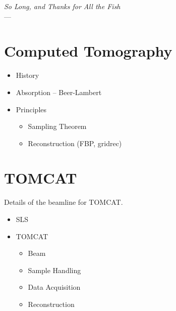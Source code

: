\label{ch:ct}
\begin{flushright}{\slshape    
		So Long, and Thanks for All the Fish} \\ \medskip
    ---  \citep{Adams1984}
\end{flushright}
\section{Computed Tomography}
\begin{itemize}
    \item History
    \item Absorption -- Beer-Lambert
    \item Principles
    \begin{itemize}
        \item Sampling Theorem
        \item Reconstruction (FBP, gridrec)
    \end{itemize}
\end{itemize}

\section{TOMCAT}
Details of the beamline for \ac{TOMCAT}.

\begin{itemize}
    \item SLS
    \item TOMCAT
    \begin{itemize}
        \item Beam
        \item Sample Handling
        \item Data Acquisition
        \item Reconstruction
    \end{itemize}
\end{itemize}